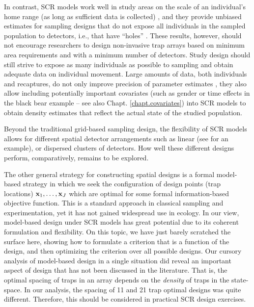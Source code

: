 In contrast, SCR models work well in study areas on the scale of an
individual's home range (as long as sufficient data is collected)
\citep{sollmann_etal:2012, efford_etal:2011, marques_etal:2011}, and
they provide unbiased estimates for sampling designs that do not
expose all individuals in the sampled population to detectors, i.e.,
that have ``holes'' \citep{efford_fewster:2012}.  These results,
however, should not encourage researchers to design non-invasive trap
arrays based on minimum area requirements and with a minimum number of
detectors. Study design should still strive to expose as many
individuals as possible to sampling and obtain adequate data on
individual movement. Large amounts of data, both individuals and
recaptures, do not only improve precision of parameter estimates
\citep{sollmann_etal:2012, efford_etal:2004}, they also allow
including potentially important covariates (such as gender or time
effects in the black bear example -- see also
Chapt. \ref{chapt.covariates}) into SCR models to obtain density
estimates that reflect the actual state of the studied population.

Beyond the traditional grid-based sampling design, the flexibility of
SCR models allows for different spatial detector arrangements such as
linear (see \citet{efford_etal:2011} for an example), or dispersed
clusters of detectors. How well these different
designs perform, comparatively, remains to be explored.

The other general strategy for constructing spatial designs is a
formal model-based strategy in which we seek the configuration of
design points (trap locations) ${\bf x}_{1},\ldots, {\bf x}_{J}$ which
are optimal for some formal information-based objective function.
This is a standard approach in classical sampling and experimentation,
yet it has not gained widespread use in ecology. In our view,
model-based design under SCR models has great potential due to its
coherent formulation and flexibility.  On this topic, we have just
barely scratched the surface here, showing how to formulate a
criterion that is a function of the design, and then optimizing the
criterion over all possible designs.  Our cursory analysis of
model-based design in a single situation did reveal an important
aspect of design that has not been discussed in the literature. That
is, the optimal spacing of traps in an array depends on the {\it
  density} of traps in the state-space. In our analysis, the spacing
of 11 and 21 trap optimal designs was quite different.  Therefore,
this should be considered in practical SCR design exercises.


